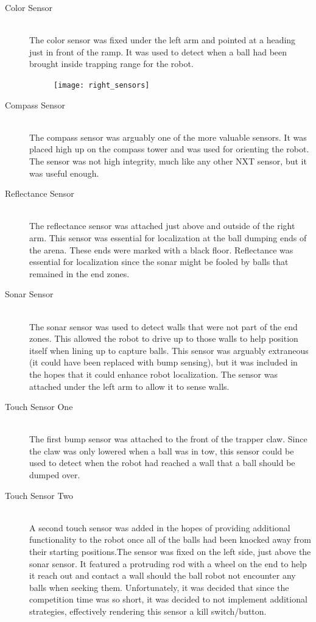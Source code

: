 \documentclass{article}
\begin{document}
\begin{description}
  \item[Color Sensor] \hfill \\
  The color sensor was fixed under the left arm and pointed at a heading just in front of the ramp. It was used to detect when a ball had been brought inside trapping range for the robot.

  \begin{figure}[h]
    \centering
    \texttt{[image: right\_sensors]}
    \caption{}
    \label{fig:color_and_light_sensors}
  \end{figure}

  \item[Compass Sensor] \hfill \\
  The compass sensor was arguably one of the more valuable sensors. It was placed high up on the compass tower and was used for orienting the robot. The sensor was not high integrity, much like any other NXT sensor, but it was useful enough.

  \item[Reflectance Sensor] \hfill \\
  The reflectance sensor was attached just above and outside of the right arm. This sensor was essential for localization at the ball dumping ends of the arena. These ends were marked with a black floor. Reflectance was essential for localization since the sonar might be fooled by balls that remained in the end zones.

  \item[Sonar Sensor] \hfill \\
  The sonar sensor was used to detect walls that were not part of the end zones. This allowed the robot to drive up to those walls to help position itself when lining up to capture balls. This sensor was arguably extraneous (it could have been replaced with bump sensing), but it was included in the hopes that it could enhance robot localization. The sensor was attached under the left arm to allow it to sense walls.

  \item[Touch Sensor One] \hfill \\
  The first bump sensor was attached to the front of the trapper claw. Since the claw was only lowered when a ball was in tow, this sensor could be used to detect when the robot had reached a wall that a ball should be dumped over.

  \item[Touch Sensor Two] \hfill \\
  A second touch sensor was added in the hopes of providing additional functionality to the robot once all of the balls had been knocked away from their starting positions.The sensor was fixed on the left side, just above the sonar sensor. It featured a protruding rod with a wheel on the end to help it reach out and contact a wall should the ball robot not encounter any balls when seeking them. Unfortunately, it was decided that since the competition time was so short, it was decided to not implement additional strategies, effectively rendering this sensor a kill switch/button.
\end{description}
\end{document}
